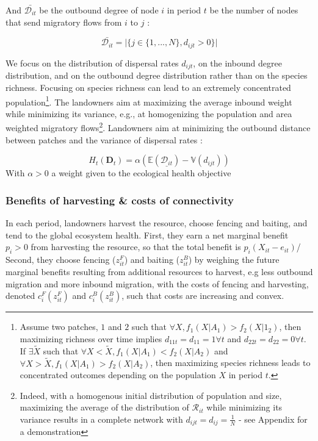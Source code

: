 \documentclass{article}
\begin{document}
And $\bar{\mathcal{D}_{it}}$ be the outbound degree of node $i$ in period $t$ be the number of nodes that send migratory flows from $i$ to $j$ : 

\begin{equation}
\bar{\mathcal{D}_{it}} = \big|\{j \in \{1, ..., N \}, d_{ijt}>0\} \big|
\end{equation}



We focus on the distribution of dispersal rates $d_{ijt}$, on the inbound degree distribution, and on the outbound degree distribution rather than on the species richness. Focusing on species richness can lead to an extremely concentrated population\footnote{Assume two patches, $1$ and $2$ such that $\forall X, f_1(X|A_1)>f_2(X|1_2)$, then maximizing richness over time implies $d_{11t}=d_{11}=1 \forall t$ and $d_{22t} = d_{22} = 0 \forall t$. If $\exists \tilde{X}$ such that $\forall X<\tilde{X}, f_1(X|A_1)<f_2(X|A_2)$ and $\forall X>\tilde{X}, f_1(X|A_1)>f_2(X|A_2)$, then maximizing species richness leads to concentrated outcomes depending on the population $X$ in period $t$.}. The landowners aim at maximizing the average inbound weight while minimizing its variance, e.g., at homogenizing the population and area weighted migratory flows\footnote{Indeed, with a homogenous initial distribution of population and size, maximizing the average of the distribution of $\mathcal{R}_{it}$ while minimizing its variance results in a complete network with $d_{ijt}=d_{ij}= \frac{1}{N}$ - see Appendix for a demonstration}. Landowners aim at minimizing the outbound distance between patches and the variance of dispersal rates : 

\begin{equation}
H_t(\mathbf{D}_t) = \alpha \left(\mathbb{E}(\underline{\mathcal{D}_{it}}) - \mathbb{V}(d_{ijt}) \right)
\end{equation}
With $\alpha >0$ a weight given to the ecological health objective

\subsubsection{Benefits of harvesting \& costs of connectivity}
In each period, landowners harvest the resource, choose fencing and baiting, and tend to the global ecosystem health. 
First, they earn a net marginal benefit $p_i>0$ from harvesting the resource, 
so that the total benefit is $p_i(X_{it}-e_{it})$/
Second, they choose fencing ($z_{it}^F$) and baiting ($z_{it}^B$) by weighing the future marginal benefits resulting from additional resources to harvest, e.g less outbound migration and more inbound migration, with the  costs of fencing and harvesting, denoted $c_i^F(z_{it}^F)$ and $c_i^B(z_{it}^B)$, such that costs are increasing and convex. 
\end{document}
